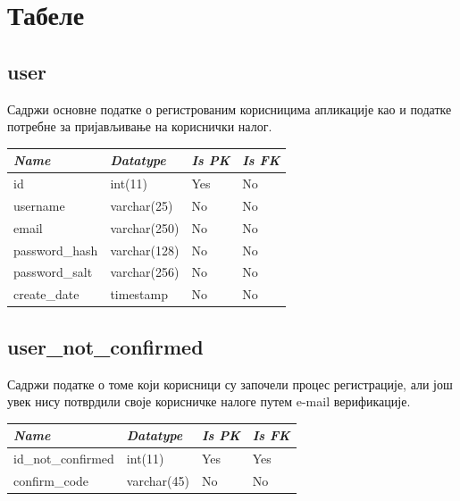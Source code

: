 \section{Табеле}

\subsection{user}
Садржи основне податке о регистрованим корисницима апликације као и податке потребне за
пријављивање на кориснички налог.

\begin{table}[h!]
\centering
\small

    \begin{tabular}{ | m{} | m{} | m{} | m{} | }
    \hline
        \cellcolor{blue!25}\textbf{\textit{Name}} &

        \cellcolor{blue!25}\textbf{\textit{Datatype}} &
        \cellcolor{blue!25}\textbf{\textit{Is PK}} &
        \cellcolor{blue!25}\textbf{\textit{Is FK}} \\
    \hline
    \hline
        id & int(11) & Yes & No \\
    \hline
        username & varchar(25) & No & No \\
    \hline
        email & varchar(250) & No & No \\
    \hline
        password\_hash & varchar(128) & No & No \\
    \hline
        password\_salt & varchar(256) & No & No \\
    \hline
        create\_date & timestamp & No & No \\
    \hline
    \end{tabular}

\end{table}



\subsection{user\_not\_confirmed}
Садржи податке о томе који корисници су започели процес регистрације, али још увек нису потврдили
своје корисничке налоге путем e-mail верификације.

\begin{table}[h!]
\centering
\small

    \begin{tabular}{ | m{} | m{} | m{} | m{} | }
    \hline
        \cellcolor{blue!25}\textbf{\textit{Name}} &

        \cellcolor{blue!25}\textbf{\textit{Datatype}} &
        \cellcolor{blue!25}\textbf{\textit{Is PK}} &
        \cellcolor{blue!25}\textbf{\textit{Is FK}} \\
    \hline
    \hline
        id\_not\_confirmed & int(11) & Yes & Yes \\
    \hline
        confirm\_code & varchar(45) & No & No \\
    \hline
    \end{tabular}

\end{table}

